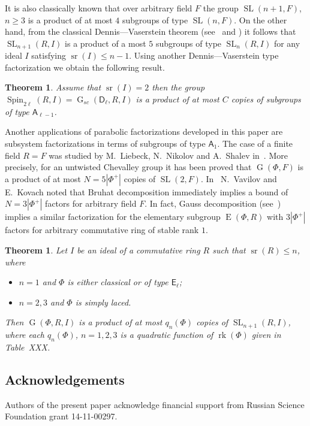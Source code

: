 \documentclass[12pt]{amsart}
\numberwithin{equation}{section}
\newcounter{thmcounter} \newcounter{lemmacounter}
\newtheorem{thm}[thmcounter]{Theorem}
\theoremstyle{definition}
\DeclareMathOperator{\G}{G}
\DeclareMathOperator{\SL}{SL}
\DeclareMathOperator{\E}{E}
\DeclareMathOperator{\sr}{sr}
\DeclareMathOperator{\Spin}{Spin}
\DeclareMathOperator{\rk}{rk}
\newcommand{\rA}{\mathsf{A}}
\newcommand{\rD}{\mathsf{D}}
\newcommand{\rE}{\mathsf{E}}
\begin{document}
It is also classically known that over arbitrary field $F$ the group $\SL(n+1, F)$, $n\geq 3$ is a product of at most $4$ subgroups of type $\SL(n, F)$.
On the other hand, from the classical Dennis---Vaserstein theorem (see~\cite{Va69} and \cite[Lemma~2.1]{ST76})
it follows that $\SL_{n+1}(R, I)$ is a product of a most $5$ subgroups of type $\SL_n(R, I)$ for any ideal $I$ satisfying $\sr(I)\leq n-1$.
Using another Dennis---Vaserstein type factorization we obtain the following result.
\begin{thm} Assume that $\sr(I) = 2$ then the group $\Spin_{2\ell}(R, I)=\G_{sc}(\rD_\ell, R, I)$ is a product of at most $C$ copies of subgroups of type $\rA_{\ell-1}$. \end{thm}

Another applications of parabolic factorizations developed in this paper are subsystem factorizations in terms of subgroups of type $\rA_1$.
The case of a finite field $R=F$ was studied by M.~Liebeck, N.~Nikolov and A.~Shalev in~\cite{NikProdDecomp}.
More precisely, for an untwisted Chevalley group it has been proved that $\G(\Phi, F)$ is a product of at most $N=5|\Phi^+|$ copies of $\SL(2, F)$.
In~\cite{VavKovSL2} N.~Vavilov and E.~Kovach noted that Bruhat decomposition immediately implies a bound of $N=3|\Phi^+|$ factors for arbitrary field $F$.
In fact, Gauss decomposition (see~\cite{Sm12}) implies a similar factorization for the elementary subgroup $\E(\Phi, R)$ with $3|\Phi^+|$ factors for arbitrary commutative ring of stable rank $1$.

\begin{thm} Let $I$ be an ideal of a commutative ring $R$ such that $\sr(R)\leq n$, where
\begin{itemize}
 \item $n=1$ and $\Phi$ is either classical or of type $\rE_\ell$;
 \item $n=2, 3$ and $\Phi$ is simply laced.
\end{itemize}
Then $\G(\Phi, R, I)$ is a product of at most $q_{n}(\Phi)$ copies of $\SL_{n+1}(R, I)$, where each $q_{n}(\Phi)$, $n=1,2,3$ is a quadratic function of $\rk(\Phi)$ given in Table~XXX.
\end{thm}


\subsection{Acknowledgements}
Authors of the present paper acknowledge financial support from Russian Science Foundation grant 14-11-00297.
\end{document}
